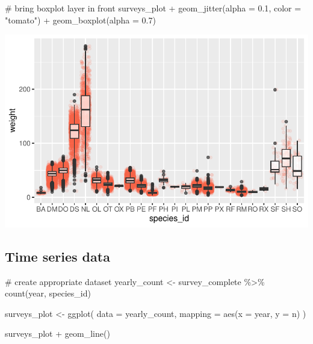 \documentclass[
  letterpaper,
  DIV=11,
  numbers=noendperiod]{scrreprt}
\newenvironment{Shaded}{\begin{snugshade}}{\end{snugshade}}
\newcommand{\AttributeTok}[1]{\textcolor[rgb]{0.40,0.45,0.13}{#1}}
\newcommand{\CommentTok}[1]{\textcolor[rgb]{0.37,0.37,0.37}{#1}}
\newcommand{\FloatTok}[1]{\textcolor[rgb]{0.68,0.00,0.00}{#1}}
\newcommand{\FunctionTok}[1]{\textcolor[rgb]{0.28,0.35,0.67}{#1}}
\newcommand{\NormalTok}[1]{\textcolor[rgb]{0.00,0.23,0.31}{#1}}
\newcommand{\OtherTok}[1]{\textcolor[rgb]{0.00,0.23,0.31}{#1}}
\newcommand{\SpecialCharTok}[1]{\textcolor[rgb]{0.37,0.37,0.37}{#1}}
\newcommand{\StringTok}[1]{\textcolor[rgb]{0.13,0.47,0.30}{#1}}
\begin{document}
\begin{Shaded}
\begin{Highlighting}[]
\CommentTok{\# bring boxplot layer in front}
\NormalTok{surveys\_plot }\SpecialCharTok{+} \FunctionTok{geom\_jitter}\NormalTok{(}\AttributeTok{alpha =} \FloatTok{0.1}\NormalTok{, }\AttributeTok{color =} \StringTok{"tomato"}\NormalTok{) }\SpecialCharTok{+}
  \FunctionTok{geom\_boxplot}\NormalTok{(}\AttributeTok{alpha =} \FloatTok{0.7}\NormalTok{)}
\end{Highlighting}
\end{Shaded}

\includegraphics{src/notebooks/r_files/figure-pdf/unnamed-chunk-46-3.pdf}

\subsection{Time series data}\label{time-series-data}

\begin{Shaded}
\begin{Highlighting}[]
\CommentTok{\# create appropriate dataset}
\NormalTok{yearly\_count }\OtherTok{\textless{}{-}}\NormalTok{ survey\_complete }\SpecialCharTok{\%\textgreater{}\%}
  \FunctionTok{count}\NormalTok{(year, species\_id)}

\NormalTok{surveys\_plot }\OtherTok{\textless{}{-}} \FunctionTok{ggplot}\NormalTok{(}
  \AttributeTok{data =}\NormalTok{ yearly\_count,}
  \AttributeTok{mapping =} \FunctionTok{aes}\NormalTok{(}\AttributeTok{x =}\NormalTok{ year, }\AttributeTok{y =}\NormalTok{ n)}
\NormalTok{)}

\NormalTok{surveys\_plot }\SpecialCharTok{+} \FunctionTok{geom\_line}\NormalTok{()}
\end{Highlighting}
\end{Shaded}
\end{document}
